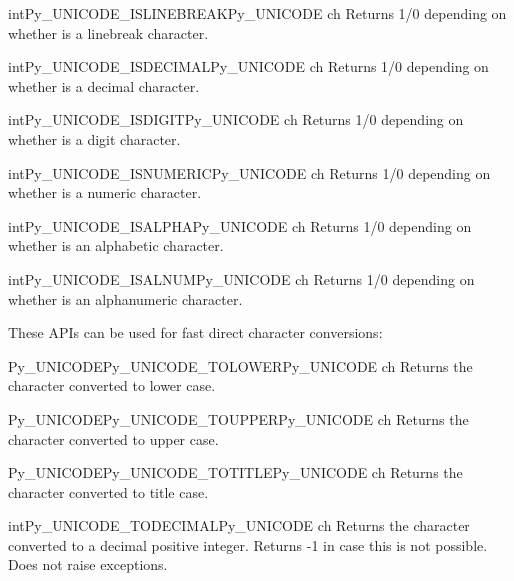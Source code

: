 \documentclass{manual}
\begin{document}
\begin{cfuncdesc}{int}{Py_UNICODE_ISLINEBREAK}{Py_UNICODE ch}
Returns 1/0 depending on whether  is a linebreak character.
\end{cfuncdesc}

\begin{cfuncdesc}{int}{Py_UNICODE_ISDECIMAL}{Py_UNICODE ch}
Returns 1/0 depending on whether  is a decimal character.
\end{cfuncdesc}

\begin{cfuncdesc}{int}{Py_UNICODE_ISDIGIT}{Py_UNICODE ch}
Returns 1/0 depending on whether  is a digit character.
\end{cfuncdesc}

\begin{cfuncdesc}{int}{Py_UNICODE_ISNUMERIC}{Py_UNICODE ch}
Returns 1/0 depending on whether  is a numeric character.
\end{cfuncdesc}

\begin{cfuncdesc}{int}{Py_UNICODE_ISALPHA}{Py_UNICODE ch}
Returns 1/0 depending on whether  is an alphabetic character.
\end{cfuncdesc}

\begin{cfuncdesc}{int}{Py_UNICODE_ISALNUM}{Py_UNICODE ch}
Returns 1/0 depending on whether  is an alphanumeric character.
\end{cfuncdesc}

These APIs can be used for fast direct character conversions:

\begin{cfuncdesc}{Py_UNICODE}{Py_UNICODE_TOLOWER}{Py_UNICODE ch}
Returns the character  converted to lower case.
\end{cfuncdesc}

\begin{cfuncdesc}{Py_UNICODE}{Py_UNICODE_TOUPPER}{Py_UNICODE ch}
Returns the character  converted to upper case.
\end{cfuncdesc}

\begin{cfuncdesc}{Py_UNICODE}{Py_UNICODE_TOTITLE}{Py_UNICODE ch}
Returns the character  converted to title case.
\end{cfuncdesc}

\begin{cfuncdesc}{int}{Py_UNICODE_TODECIMAL}{Py_UNICODE ch}
Returns the character  converted to a decimal positive integer.
Returns -1 in case this is not possible. Does not raise exceptions.
\end{cfuncdesc}
\end{document}
